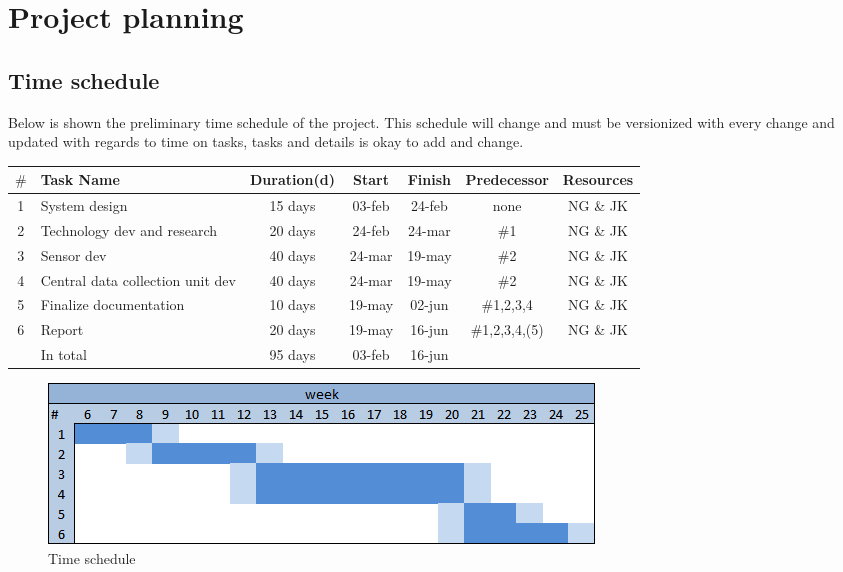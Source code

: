 \chapter{Project planning}
\section{Time schedule}
Below is shown the preliminary time schedule of the project. This schedule will change and must be versionized with every change and updated with regards to time on tasks, tasks and details is okay to add and change.\\ 

\begin{table}[H]
\centering
\begin{tabular}{|c |p{4cm} |c |c |c |c |c|}
\hline 
$\#$ & Task Name & Duration(d) & Start & Finish & Predecessor & Resources \\ 
\hline 
1 & System design & 15 days & 03-feb & 24-feb & none & NG \& JK \\ 
\hline 
2 & Technology dev and research & 20 days & 24-feb & 24-mar & $\#$1 & NG \& JK \\ 
\hline 
3 & Sensor dev & 40 days & 24-mar & 19-may & $\#$2 & NG \& JK \\ 
\hline 
4 & Central data collection unit dev & 40 days & 24-mar & 19-may & $\#$2 & NG \& JK \\ 
\hline 
5 & Finalize documentation & 10 days & 19-may & 02-jun & $\#$1,2,3,4 & NG \& JK \\ 
\hline 
6 & Report & 20 days & 19-may & 16-jun & $\#$1,2,3,4,(5) & NG \& JK \\ 
\hline \hline
~ & In total & 95 days & 03-feb & 16-jun & ~ & ~ \\ 
\hline 
\end{tabular} 
\end{table}

\begin{figure}[H]
\centering
\includegraphics[scale=1]{billeder/timeschedule.png}
\caption{Time schedule}
\end{figure}

